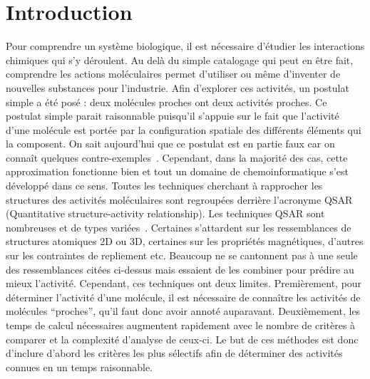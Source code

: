 

\section{Introduction}

Pour comprendre un système biologique, il est nécessaire d'étudier les interactions chimiques qui s'y déroulent.
Au delà du simple catalogage qui peut en être fait, comprendre les actions moléculaires permet d'utiliser ou même d'inventer de nouvelles substances pour l'industrie.
Afin d'explorer ces activités, un postulat simple a été posé : deux molécules proches ont deux activités proches.
Ce postulat simple parait raisonnable puisqu'il s'appuie sur le fait que l'activité d'une molécule est portée par la configuration spatiale des différents éléments qui la composent.
On sait aujourd'hui que ce postulat est en partie faux car on connaît quelques contre-exemples~\cite{patani_bioisosterism:_1996}.
Cependant, dans la majorité des cas, cette approximation fonctionne bien et tout un domaine de chemoinformatique s'est développé dans ce sens.
Toutes les techniques cherchant à rapprocher les structures des activités moléculaires sont regroupées derrière l'acronyme QSAR (Quantitative structure-activity relationship).
Les techniques QSAR sont nombreuses et de types variées~\cite{patani_bioisosterism:_1996,leach_molecular_2001,helma_predictive_2005}.
Certaines s'attardent sur les ressemblances de structures atomiques 2D ou 3D, certaines sur les propriétés magnétiques, d'autres sur les contraintes de repliement etc.
Beaucoup ne se cantonnent pas à une seule des ressemblances citées ci-dessus mais essaient de les combiner pour prédire au mieux l'activité.
Cependant, ces techniques ont deux limites.
Premièrement, pour déterminer l'activité d'une molécule, il est nécessaire de connaître les activités de molécules ``proches'', qu'il faut donc avoir annoté auparavant.
Deuxièmement, les temps de calcul nécessaires augmentent rapidement avec le nombre de critères à comparer et la complexité d'analyse de ceux-ci.
Le but de ces méthodes est donc d'inclure d'abord les critères les plus sélectifs afin de déterminer des activités connues en un temps raisonnable.

